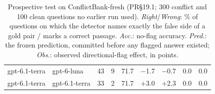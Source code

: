 \begin{table}[t]
\begin{tabular}{@{}llrrrrrrr@{}}
gpt-6.1-terra & gpt-6-luna & 43 & 9 & 71.7 & $-$1.7 & $-$0.7 & 0.0 & 0.0 \\
gpt-6.1-terra & gpt-6.1-terra & 33 & 2 & 71.7 & $+$3.0 & $+$2.3 & 0.0 & 0.0 \\
\bottomrule
\end{tabular}
\caption{Prospective test on ConflictBank-fresh (PR\S19.1; 300 conflict and 100 clean questions no earlier run used).
\emph{Right}/\emph{Wrong}: \% of questions on which the detector names exactly the false side of a gold pair / marks a
correct passage. \emph{Acc.}: no-flag accuracy. \emph{Pred.}: the frozen prediction, committed before any flagged
answer existed; \emph{Obs.}: observed directional-flag effect, in points.}
\label{tab:fresh}
\end{table}
